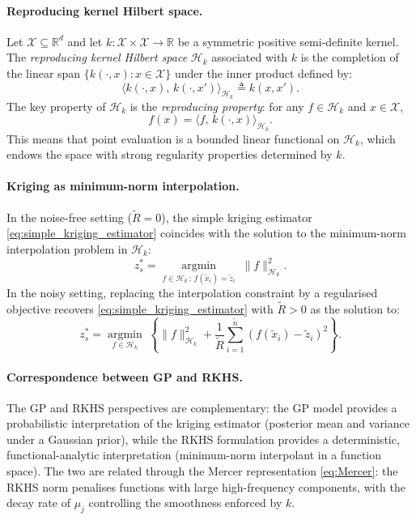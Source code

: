 \paragraph{Reproducing kernel Hilbert space.} Let $\mathcal{X} \subseteq
\mathbb{R}^d$ and let $k : \mathcal{X} \times \mathcal{X} \to \mathbb{R}$ be
a symmetric positive semi-definite kernel. The \emph{reproducing kernel Hilbert
space} $\mathcal{H}_k$ associated with $k$ is the completion of the linear
span $\{k(\cdot, x) : x \in \mathcal{X}\}$ under the inner product defined by:
\begin{equation}
    \langle k(\cdot, x),\, k(\cdot, x') \rangle_{\mathcal{H}_k}
    \triangleq k(x, x').
    \label{eq:RKHS_inner_product}
\end{equation}
The key property of $\mathcal{H}_k$ is the \emph{reproducing property}: for
any $f \in \mathcal{H}_k$ and $x \in \mathcal{X}$,
\begin{equation}
    f(x) = \langle f,\, k(\cdot, x) \rangle_{\mathcal{H}_k}.
    \label{eq:reproducing_property}
\end{equation}
This means that point evaluation is a bounded linear functional on
$\mathcal{H}_k$, which endows the space with strong regularity properties
determined by $k$.

\paragraph{Kriging as minimum-norm interpolation.} In the noise-free setting
($\tilde{R} = 0$), the simple kriging estimator \eqref{eq:simple_kriging_estimator}
coincides with the solution to the minimum-norm interpolation problem in
$\mathcal{H}_k$:
\begin{equation}
    z^*_s = \underset{f \in \mathcal{H}_k\,:\,f(\tilde{x}_i) = \tilde{z}_i}
    {\operatorname{argmin}}\;\|f\|^2_{\mathcal{H}_k}.
    \label{eq:RKHS_interpolation}
\end{equation}
In the noisy setting, replacing the interpolation constraint by a regularised
objective recovers \eqref{eq:simple_kriging_estimator} with $\tilde{R} > 0$
as the solution to:
\begin{equation}
    z^*_s = \underset{f \in \mathcal{H}_k}{\operatorname{argmin}}\;
    \left\{\|f\|^2_{\mathcal{H}_k}
    + \frac{1}{\tilde{R}}\sum_{i=1}^{\tilde{n}}
    (f(\tilde{x}_i) - \tilde{z}_i)^2\right\}.
    \label{eq:RKHS_regularisation}
\end{equation}

\paragraph{Correspondence between GP and RKHS.} The GP and RKHS perspectives
are complementary: the GP model provides a probabilistic interpretation of the
kriging estimator (posterior mean and variance under a Gaussian prior), while
the RKHS formulation provides a deterministic, functional-analytic
interpretation (minimum-norm interpolant in a function space). The two are
related through the Mercer representation \eqref{eq:Mercer}: the RKHS norm
penalises functions with large high-frequency components, with the decay rate
of $\mu_j$ controlling the smoothness enforced by $k$.

